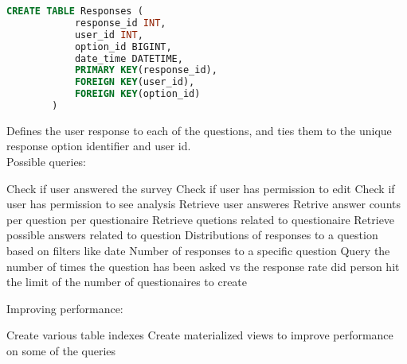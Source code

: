 \documentclass[12pt, oneside, a4paper]{article}
\begin{document}
    \begin{lstlisting}[language=SQL, columns=flexible]
        CREATE TABLE Responses (
            response_id INT,
            user_id INT,
            option_id BIGINT, 
            date_time DATETIME,
            PRIMARY KEY(response_id),
            FOREIGN KEY(user_id), 
            FOREIGN KEY(option_id)
        ) 
    \end{lstlisting}
    Defines the user response to each of the questions, and ties them to the unique response option identifier and user id.
    \\

    Possible queries: 
    \begin{outline}
        \1 Check if user answered the survey
        \1 Check if user has permission to edit 
        \1 Check if user has permission to see analysis
        \1 Retrieve user answeres
        \1 Retrive answer counts per question per questionaire
        \1 Retrieve quetions related to questionaire
        \1 Retrieve possible answers related to question
        \1 Distributions of responses to a question based on filters like date
        \1 Number of responses to a specific question
        \1 Query the number of times the question has been asked vs the response rate
        \1 did person hit the limit of the number of questionaires to create
    \end{outline}
    
    Improving performance:
    \begin{outline}
        \1 Create various table indexes
        \1 Create materialized views to improve performance on some of the queries
    \end{outline}
\end{document}

